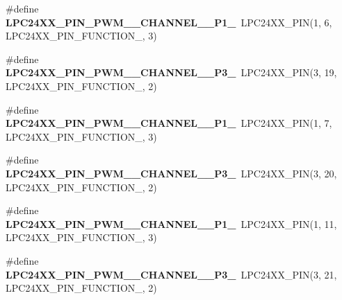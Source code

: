 \begin{DoxyCompactItemize}
\item 
\mbox{\label{group__lpc24xx__io_gaa3896868234ccc5dd10f35d004f7411c}} 
\#define {\bfseries L\+P\+C24\+X\+X\+\_\+\+P\+I\+N\+\_\+\+P\+W\+M\+\_\+\_\+\+C\+H\+A\+N\+N\+E\+L\+\_\+\_\+\+P1\+\_}~L\+P\+C24\+X\+X\+\_\+\+P\+IN(1, 6, L\+P\+C24\+X\+X\+\_\+\+P\+I\+N\+\_\+\+F\+U\+N\+C\+T\+I\+O\+N\+\_, 3)
\item 
\mbox{\label{group__lpc24xx__io_gaca202ea7534f939ba806a4494cfa2d1e}} 
\#define {\bfseries L\+P\+C24\+X\+X\+\_\+\+P\+I\+N\+\_\+\+P\+W\+M\+\_\+\_\+\+C\+H\+A\+N\+N\+E\+L\+\_\+\_\+\+P3\+\_}~L\+P\+C24\+X\+X\+\_\+\+P\+IN(3, 19, L\+P\+C24\+X\+X\+\_\+\+P\+I\+N\+\_\+\+F\+U\+N\+C\+T\+I\+O\+N\+\_, 2)
\item 
\mbox{\label{group__lpc24xx__io_gafb9bd5ee0f0182dc00499b71fc33faaf}} 
\#define {\bfseries L\+P\+C24\+X\+X\+\_\+\+P\+I\+N\+\_\+\+P\+W\+M\+\_\+\_\+\+C\+H\+A\+N\+N\+E\+L\+\_\+\_\+\+P1\+\_}~L\+P\+C24\+X\+X\+\_\+\+P\+IN(1, 7, L\+P\+C24\+X\+X\+\_\+\+P\+I\+N\+\_\+\+F\+U\+N\+C\+T\+I\+O\+N\+\_, 3)
\item 
\mbox{\label{group__lpc24xx__io_ga07a528c06c81643f7492c847c31bf916}} 
\#define {\bfseries L\+P\+C24\+X\+X\+\_\+\+P\+I\+N\+\_\+\+P\+W\+M\+\_\+\_\+\+C\+H\+A\+N\+N\+E\+L\+\_\+\_\+\+P3\+\_}~L\+P\+C24\+X\+X\+\_\+\+P\+IN(3, 20, L\+P\+C24\+X\+X\+\_\+\+P\+I\+N\+\_\+\+F\+U\+N\+C\+T\+I\+O\+N\+\_, 2)
\item 
\mbox{\label{group__lpc24xx__io_ga84d31c1f0e96c8d1c8b567a0516125d2}} 
\#define {\bfseries L\+P\+C24\+X\+X\+\_\+\+P\+I\+N\+\_\+\+P\+W\+M\+\_\+\_\+\+C\+H\+A\+N\+N\+E\+L\+\_\+\_\+\+P1\+\_}~L\+P\+C24\+X\+X\+\_\+\+P\+IN(1, 11, L\+P\+C24\+X\+X\+\_\+\+P\+I\+N\+\_\+\+F\+U\+N\+C\+T\+I\+O\+N\+\_, 3)
\item 
\mbox{\label{group__lpc24xx__io_gada11020f14d2fbc177e7faf10a794764}} 
\#define {\bfseries L\+P\+C24\+X\+X\+\_\+\+P\+I\+N\+\_\+\+P\+W\+M\+\_\+\_\+\+C\+H\+A\+N\+N\+E\+L\+\_\+\_\+\+P3\+\_}~L\+P\+C24\+X\+X\+\_\+\+P\+IN(3, 21, L\+P\+C24\+X\+X\+\_\+\+P\+I\+N\+\_\+\+F\+U\+N\+C\+T\+I\+O\+N\+\_, 2)
\item 
\mbox{\label{group__lpc24xx__io_gabfca08bdc919888821e7cf95dbf8c581}} 

\end{DoxyCompactItemize}
